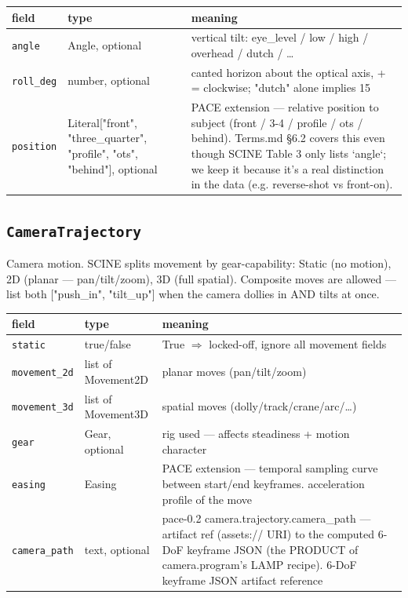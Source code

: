 \begin{longtable}{@{}R{0.24\textwidth}R{0.21\textwidth}R{0.49\textwidth}@{}}
\toprule \textbf{field} & \textbf{type} & \textbf{meaning} \\ \midrule
\endhead
\texttt{angle} & Angle, optional & vertical tilt: eye\_\allowbreak level /\allowbreak{} low /\allowbreak{} high /\allowbreak{} overhead /\allowbreak{} dutch /\allowbreak{} \ldots{} \\
\texttt{roll\_\allowbreak deg} & number, optional & canted horizon about the optical axis, + = clockwise; "dutch" alone implies 15 \\
\texttt{position} & Literal["front", \allowbreak "three\_\allowbreak quarter", \allowbreak "profile", \allowbreak "ots", \allowbreak "behind"], optional & PACE extension ---\allowbreak{} relative position to subject (front /\allowbreak{} 3-4 /\allowbreak{} profile /\allowbreak{} ots /\allowbreak{} behind). Terms.md \S{}6.2 covers this even though SCINE Table 3 only lists `angle`; we keep it because it's a real distinction in the data (e.g. reverse-shot vs front-on). \\
\bottomrule
\end{longtable}

\subsection*{\texttt{CameraTrajectory}}
\noindent Camera motion. SCINE splits movement by gear-capability: Static (no motion), 2D (planar ---\allowbreak{} pan/\allowbreak{}tilt/\allowbreak{}zoom), 3D (full spatial). Composite moves are allowed ---\allowbreak{} list both ["push\_\allowbreak in", "tilt\_\allowbreak up"] when the camera dollies in AND tilts at once.

\begin{longtable}{@{}R{0.24\textwidth}R{0.21\textwidth}R{0.49\textwidth}@{}}
\toprule \textbf{field} & \textbf{type} & \textbf{meaning} \\ \midrule
\endhead
\texttt{static} & true/\allowbreak{}false & True $\Rightarrow$ locked-off, ignore all movement fields \\
\texttt{movement\_\allowbreak 2d} & list of Movement2D & planar moves (pan/\allowbreak{}tilt/\allowbreak{}zoom) \\
\texttt{movement\_\allowbreak 3d} & list of Movement3D & spatial moves (dolly/\allowbreak{}track/\allowbreak{}crane/\allowbreak{}arc/\allowbreak{}\ldots{}) \\
\texttt{gear} & Gear, optional & rig used ---\allowbreak{} affects steadiness + motion character \\
\texttt{easing} & Easing & PACE extension ---\allowbreak{} temporal sampling curve between start/\allowbreak{}end keyframes. acceleration profile of the move \\
\texttt{camera\_\allowbreak path} & text, optional & pace-0.2 camera.trajectory.camera\_\allowbreak path ---\allowbreak{} artifact ref (assets:/\allowbreak{}/\allowbreak{} URI) to the computed 6-DoF keyframe JSON (the PRODUCT of camera.program's LAMP recipe). 6-DoF keyframe JSON artifact reference \\
\bottomrule
\end{longtable}

